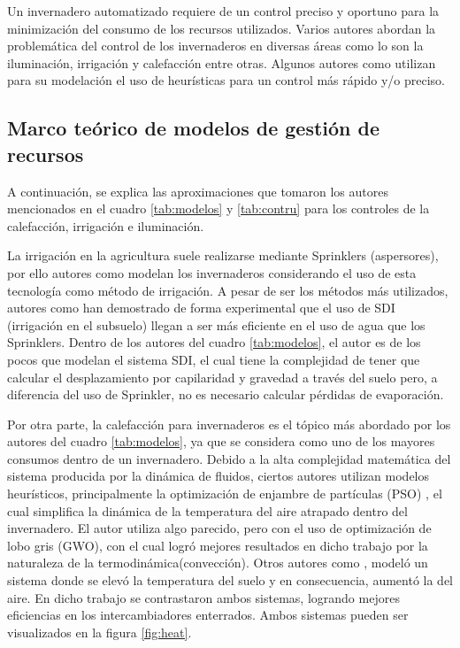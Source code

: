 \documentclass[12pt,a4paper]{article}
\begin{document}
	Un invernadero automatizado requiere de un control preciso y oportuno para la minimización del consumo de los recursos utilizados. Varios autores abordan la problemática del control de los invernaderos en diversas áreas como lo son la iluminación, irrigación y calefacción entre otras. Algunos autores como \textcite{Hasni2011, Singhal2017, Chen2018} utilizan para su modelación el uso de heurísticas para un control más rápido y/o preciso.
	
\subsection{Marco teórico de modelos de gestión de recursos}

	
	
	 A continuación, se explica las aproximaciones que tomaron los autores mencionados en el cuadro \ref{tab:modelos} y \ref{tab:contru} para los controles de la calefacción, irrigación e iluminación. 
	 
		La irrigación en la agricultura suele realizarse mediante Sprinklers (aspersores), por ello autores como \parencite{Gijzen1998, Dong2018} modelan los invernaderos considerando el uso de esta tecnología como método de irrigación. A pesar de ser los métodos más utilizados, autores como \parencite{Of2000, Kazumba2010, Zaccaria2017} han demostrado de forma experimental que el uso de SDI (irrigación en el subsuelo) llegan a ser más eficiente en el uso de agua que los Sprinklers. Dentro de los autores del cuadro \ref{tab:modelos}, el autor \parencite{Kandelous2010} es de los pocos que modelan el sistema SDI, el cual tiene la complejidad de tener que calcular el desplazamiento por capilaridad y gravedad a través del suelo pero, a diferencia del uso de Sprinkler, no es necesario calcular pérdidas de evaporación.
		
		Por otra parte, la calefacción para invernaderos es el tópico más abordado por los autores del cuadro \ref{tab:modelos}, ya que se considera como uno de los mayores consumos dentro de un invernadero\parencite{Chen2015}. Debido a la alta complejidad matemática del sistema producida por la dinámica de fluidos, ciertos autores utilizan modelos heurísticos, principalmente la optimización de enjambre de partículas (PSO) \parencite{Hasni2011,Chen2018}, el cual simplifica la dinámica de la temperatura del aire atrapado dentro del invernadero. El autor\parencite{Singhal2017} utiliza algo parecido, pero con el uso de optimización de lobo gris (GWO), con el cual logró mejores resultados en dicho trabajo por la naturaleza de la termodinámica(convección). Otros autores como \textcite{Kurpaska2000}, modeló un sistema donde se elevó la temperatura del suelo y en consecuencia, aumentó la del aire. En dicho trabajo se contrastaron ambos sistemas, logrando mejores eficiencias en los intercambiadores enterrados. Ambos sistemas pueden ser visualizados en la figura \ref{fig:heat}.
\end{document}
